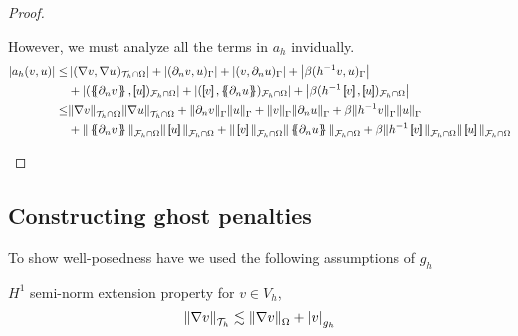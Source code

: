\begin{proof}
\begin{enumerate}[label=\arabic*)]
    However, we must analyze all the terms in $a_{h}$ invidually.   \[
        \begin{split}
    \left\lvert a_{h}( v,u)  \right\rvert \le & \left\lvert( \nabla v, \nabla u)_{\mathcal{T} _{h} \cap \Omega }  \right\rvert +  \left\lvert  ( \partial _{n} v,u)_{\Gamma } \right\rvert   + \left\lvert ( v, \partial _{n} u)_{\Gamma } \right\rvert  +
    \left\lvert\beta ( h^{-1} v,u)_{\Gamma }  \right\rvert  \\
    & + \left\lvert( \mean{ \partial _{n} v }  , \jump{ u }  ) _{\mathcal{F} _{h} \cap \Omega }  \right\rvert  + \left\lvert ( \jump{ v }  , \mean{ \partial _{n} u }  )_{\mathcal{F} _{h}\cap \Omega } \right\rvert  + \left\lvert \beta ( h^{-1} \jump{ v }  ,
    \jump{ u }  )_{\mathcal{F}_{h}\cap \Omega  } \right\rvert \\
     \le & \| \nabla v \|_{ \mathcal{T} _{h}\cap \Omega  }^{  }\| \nabla u \|_{ \mathcal{T} _{h} \cap \Omega  }^{  }
    + \| \partial _{n}v \|_{ \Gamma   }^{  } \| u \|_{ \Gamma  }^{  }
    + \| v \|_{ \Gamma   }^{  } \| \partial _{n}u \|_{ \Gamma  }^{  } + \beta \|h^{-1} v  \|_{\Gamma   }^{  }  \| u  \|_{\Gamma   }^{  } \\
    & + \| \mean{ \partial _{n}v }   \|_{\mathcal{F} _{h}\cap \Omega   }^{  } \| \jump{ u }   \|_{ \mathcal{F} _{h} \cap \Omega  }^{  } + \| \jump{ v }   \|_{ \mathcal{F}_{h} \cap \Omega   }^{  }  \| \mean{ \partial _{n} u }    \|_{ \mathcal{F} _{h} \cap \Omega  }^{  } +
    \beta \|h^{-1} \jump{ v }    \|_{\mathcal{F} _{h} \cap \Omega  }^{  }      \| \jump{ u } \|_{\mathcal{F} _{h} \cap \Omega   }^{  }
        \end{split}
    \]


    \end{enumerate}


\end{proof}


\subsection{Constructing ghost penalties}%
\label{sub:constructing_ghost_penalties}



To show well-posedness have we used the following assumptions of $g_{h}$

\begin{assumption}[EP1]
    \label{as:EP1}
    $H^{1}$ semi-norm extension property for $v \in  V_{h}$,  \[
    \| \nabla v \|_{ \mathcal{T} _{h} }^{  }  \lesssim \| \nabla v \|_{ \Omega  }^{  }  + \left\lvert  v  \right\rvert _{g_{h}}
    \]
\end{assumption}

